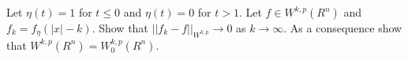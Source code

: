Let $\eta(t) = 1$ for $t \leq 0$ and $\eta(t) = 0$ for $t > 1$.
Let $f \in W^{k, p}(R^n)$ and $f_k = f_\eta(|x| - k)$.
Show that $||f_k - f||_{W^{k, p}} \rightarrow 0$ as $k \rightarrow \infty$.
As a consequence show that $W^{k, p}(R^n) = W_0^{k, p}(R^n)$.
